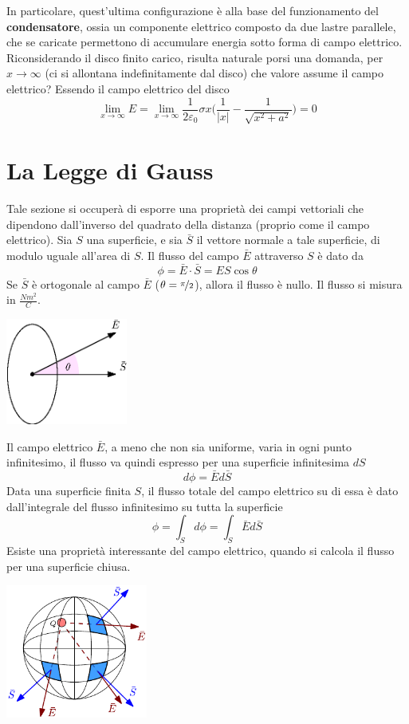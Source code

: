 \documentclass[10pt, letterpaper]{report}
\begin{document}
In particolare, quest'ultima configurazione è alla base del funzionamento del \textbf{condensatore}, ossia un componente elettrico composto da due lastre parallele, che se caricate permettono di accumulare energia sotto forma di campo elettrico.\acc 
Riconsiderando il disco finito carico, risulta naturale porsi una domanda, per $x\rightarrow \infty$ (ci si allontana indefinitamente dal disco) che valore assume il campo elettrico? Essendo il campo elettrico del disco 
$$ \lim_{x\rightarrow \infty}E= \lim_{x\rightarrow \infty} \frac{1}{2\varepsilon_0}\sigma x\Big( \frac{1}{|x|}-\frac{1}{\sqrt{x^2+a^2}} \Big)=0$$
\flowerLine 
\section{La Legge di Gauss}
Tale sezione si occuperà di esporre una proprietà dei campi vettoriali che dipendono dall'inverso del quadrato della distanza (proprio come il campo elettrico).\acc 
{} Sia $S$ una superficie, e sia $\bar S$ il vettore normale a tale superficie, di modulo uguale all'area di $S$. Il flusso del campo $\bar E$ attraverso $S$ è dato da 
$$ \phi=\bar E\cdot \bar S=ES\cos\theta$$
Se  $\bar S$ è ortogonale al campo $\bar E$ ($\theta = \nicefrac{\pi}{2}$), allora il flusso è nullo. Il flusso si misura in $\frac{Nm^2}{C}$.  \begin{center}
    \includegraphics[width=0.3\textwidth]{images/flusso.eps}
\end{center}
Il campo elettrico $\bar E$, a meno che non sia uniforme, varia in ogni punto infinitesimo, il flusso va quindi espresso per una superficie infinitesima $dS$
$$ d\phi=\bar Ed\bar S$$
Data una superficie finita $S$, il flusso totale del campo elettrico su di essa è dato dall'integrale del flusso infinitesimo su tutta la superficie 
$$ \phi = \int_S d\phi = \int_S \bar Ed\bar S$$
Esiste una proprietà interessante del campo elettrico, quando si calcola il flusso per una superficie chiusa. \begin{center}
    \includegraphics[width=0.35\textwidth]{images/flussoCampo2.pdf}
\end{center}
\end{document}

